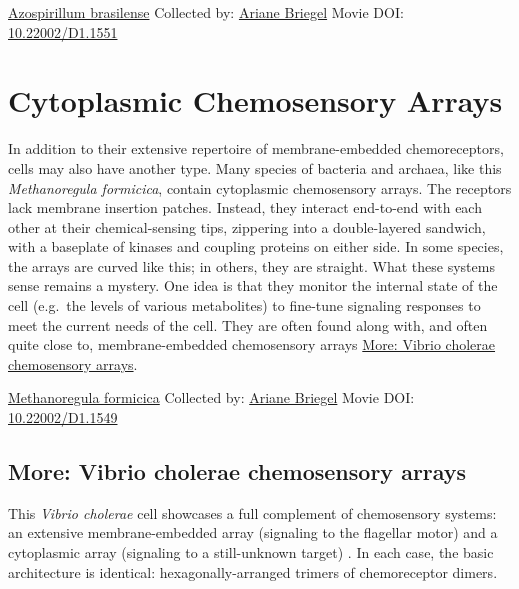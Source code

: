 \documentclass[]{tufte-book}
\begin{document}
\hypertarget{htmlwidget-a69c8e70156b6c5f4f53}{}

\label{fig:7-4a}\protect\hyperlink{tree}{Azospirillum brasilense} Collected by: \protect\hyperlink{ariane_briegel}{Ariane Briegel} Movie DOI: \href{https://doi.org/10.22002/D1.1551}{10.22002/D1.1551}

\hypertarget{cytoplasmic-chemosensory-arrays}{%
\section{Cytoplasmic Chemosensory Arrays}\label{cytoplasmic-chemosensory-arrays}}

In addition to their extensive repertoire of membrane-embedded chemoreceptors, cells may also have another type. Many species of bacteria and archaea, like this \emph{Methanoregula formicica}, contain cytoplasmic chemosensory arrays. The receptors lack membrane insertion patches. Instead, they interact end-to-end with each other at their chemical-sensing tips, zippering into a double-layered sandwich, with a baseplate of kinases and coupling proteins on either side. In some species, the arrays are curved like this; in others, they are straight. What these systems sense remains a mystery. One idea is that they monitor the internal state of the cell (e.g.~the levels of various metabolites) to fine-tune signaling responses to meet the current needs of the cell. They are often found along with, and often quite close to, membrane-embedded chemosensory arrays \protect\hyperlink{Vibrio_cholerae_chemosensory_arrays}{More: Vibrio cholerae chemosensory arrays}.



\hypertarget{htmlwidget-ba779a106cbfb470d98c}{}

\label{fig:7-5}\protect\hyperlink{tree}{Methanoregula formicica} Collected by: \protect\hyperlink{ariane_briegel}{Ariane Briegel} Movie DOI: \href{https://doi.org/10.22002/D1.1549}{10.22002/D1.1549}

\hypertarget{Vibrio_cholerae_chemosensory_arrays}{%
\subsection*{More: Vibrio cholerae chemosensory arrays}\label{Vibrio_cholerae_chemosensory_arrays}}

This \emph{Vibrio cholerae} cell showcases a full complement of chemosensory systems: an extensive membrane-embedded array (signaling to the flagellar motor) and a cytoplasmic array (signaling to a still-unknown target) . In each case, the basic architecture is identical: hexagonally-arranged trimers of chemoreceptor dimers.
\end{document}
